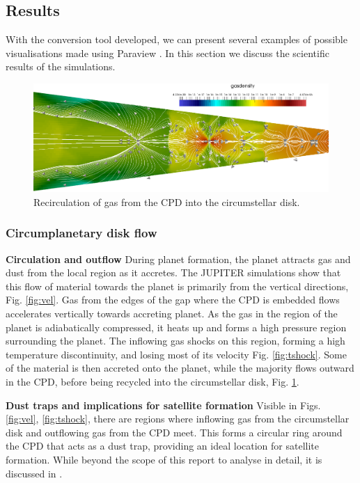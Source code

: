 \documentclass[preprint2]{aastex62}
\begin{document}
\subsection{Results}\label{sec:res}
With the conversion tool developed, we can present several examples of possible visualisations made using Paraview \cite{para}. In this section we discuss the scientific results of the simulations.
\begin{figure}
	\centering
	\includegraphics[width=\linewidth]{figures/Presentation/recirc.png}
	\caption{\label{fig:recirc} Recirculation of gas from the CPD into the circumstellar disk.}
\end{figure}

\subsubsection{Circumplanetary disk flow}
\textbf{Circulation and outflow}
During planet formation, the planet attracts gas and dust from the local region as it accretes. The JUPITER simulations show that this flow of material towards the planet is primarily from the vertical directions, Fig. \ref{fig:vel}. Gas from the edges of the gap where the CPD is embedded flows accelerates vertically towards accreting planet. As the gas in the region of the planet is adiabatically compressed, it heats up and forms a high pressure region surrounding the planet. The inflowing gas shocks on this region, forming a high temperature discontinuity, and losing most of its velocity Fig. \ref{fig:tshock}. Some of the material is then accreted onto the planet, while the majority flows outward in the CPD, before being recycled into the circumstellar disk, Fig. \ref{fig:recirc}.

\textbf{Dust traps and implications for satellite formation}
Visible in Figs.  \ref{fig:vel},  \ref{fig:tshock}, there are regions where inflowing gas from the circumstellar disk and outflowing gas from the CPD meet. This forms a circular ring around the CPD that acts as a dust trap, providing an ideal location for satellite formation. While beyond the scope of this report to analyse in detail, it is discussed in \cite{satellite}.
\end{document}
